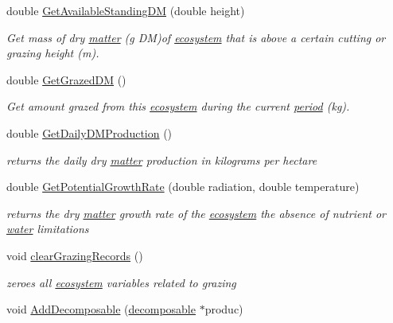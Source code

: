 \begin{DoxyCompactItemize}
double \hyperlink{classecosystem_a7ba741f8baf9bc7a8fc5f95cb308c7d2}{GetAvailableStandingDM} (double height)
\begin{DoxyCompactList}\small\item\em Get mass of dry \hyperlink{classmatter}{matter} (g DM)of \hyperlink{classecosystem}{ecosystem} that is above a certain cutting or grazing height (m). \item\end{DoxyCompactList}\item 
double \hyperlink{classecosystem_af149c5955062135fb6cff4174e6b82ba}{GetGrazedDM} ()
\begin{DoxyCompactList}\small\item\em Get amount grazed from this \hyperlink{classecosystem}{ecosystem} during the current \hyperlink{classperiod}{period} (kg). \item\end{DoxyCompactList}\item 
double \hyperlink{classecosystem_abbe9518375cd9faa312a57df3e5e3a05}{GetDailyDMProduction} ()
\begin{DoxyCompactList}\small\item\em returns the daily dry \hyperlink{classmatter}{matter} production in kilograms per hectare \item\end{DoxyCompactList}\item 
double \hyperlink{classecosystem_a132f9c1d410dd62f121e7ec0bd0e8d88}{GetPotentialGrowthRate} (double radiation, double temperature)
\begin{DoxyCompactList}\small\item\em returns the dry \hyperlink{classmatter}{matter} growth rate of the \hyperlink{classecosystem}{ecosystem} the absence of nutrient or \hyperlink{classwater}{water} limitations \item\end{DoxyCompactList}\item 
void \hyperlink{classecosystem_a9c22bfb95a0505d8c17a352a47c2c743}{clearGrazingRecords} ()
\begin{DoxyCompactList}\small\item\em zeroes all \hyperlink{classecosystem}{ecosystem} variables related to grazing \item\end{DoxyCompactList}\item 
void \hyperlink{classecosystem_aa3bf9115a761ece998311118bfad8973}{AddDecomposable} (\hyperlink{classdecomposable}{decomposable} $\ast$produc)

\end{DoxyCompactItemize}
